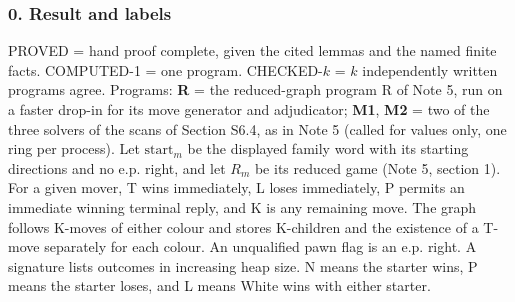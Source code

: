 \subsubsection*{0. Result and labels}
PROVED = hand proof complete, given the cited lemmas and the named finite facts. COMPUTED-1 = one program. CHECKED-$k$ = $k$ independently written programs agree. Programs: \textbf{R} = the reduced-graph program R of Note 5, run on a faster drop-in for its move generator and adjudicator; \textbf{M1}, \textbf{M2} = two of the three solvers of the scans of Section S6.4, as in Note 5 (called for values only, one ring per process). Let $\mathrm{start}_m$ be the displayed family word with its starting directions and no e.p. right, and let $R_m$ be its reduced game (Note 5, section 1). For a given mover, T wins immediately, L loses immediately, P permits an immediate winning terminal reply, and K is any remaining move. The graph follows K-moves of either colour and stores K-children and the existence of a T-move separately for each colour. An unqualified pawn flag is an e.p. right. A signature lists outcomes in increasing heap size. N means the starter wins, P means the starter loses, and L means White wins with either starter.

